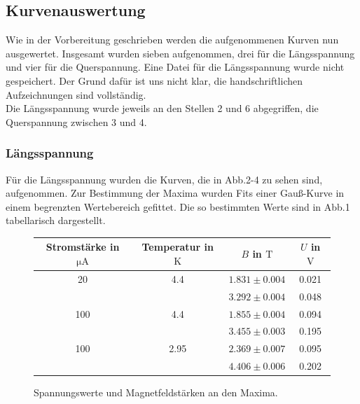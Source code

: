 \FloatBarrier
\subsection{Kurvenauswertung}

Wie in der Vorbereitung geschrieben werden die aufgenommenen Kurven nun ausgewertet. Insgesamt wurden sieben aufgenommen, drei für die Längsspannung und vier für die Querspannung. Eine Datei für die Längsspannung wurde nicht gespeichert. Der Grund dafür ist uns nicht klar, die handschriftlichen Aufzeichnungen sind vollständig. \\
Die Längsspannung wurde jeweils an den Stellen 2 und 6 abgegriffen, die Querspannung zwischen 3 und 4.

\subsubsection{Längsspannung}
Für die Längsspannung wurden die Kurven, die in Abb.2-4 zu sehen sind, aufgenommen. Zur Bestimmung der Maxima wurden Fits einer Gauß-Kurve in einem begrenzten Wertebereich gefittet. Die so bestimmten Werte sind in Abb.1 tabellarisch dargestellt.


\begin{figure}
\centering
\caption{Spannungswerte und Magnetfeldstärken an den Maxima.}
\vspace*{0.5cm}
\begin{tabular}{cccc}
\hline
Stromstärke in $\mathrm{\mu A}$ & Temperatur in $\mathrm{K}$ & $B$ in $\mathrm{T}$ & $U$ in $\mathrm{V}$ \\
\hline
\hline
20  & 4.4  & $1.831 \pm 0.004$ & 0.021 \\
	&		& $3.292 \pm 0.004$ & 0.048 \\
100 & 4.4  & $1.855 \pm 0.004$ & 0.094 \\
	&		& $3.455 \pm 0.003$ & 0.195 \\
100 & 2.95  & $2.369 \pm 0.007$ & 0.095 \\
	&		& $4.406 \pm 0.006$ & 0.202 \\
\hline
\end{tabular}
\end{figure}

